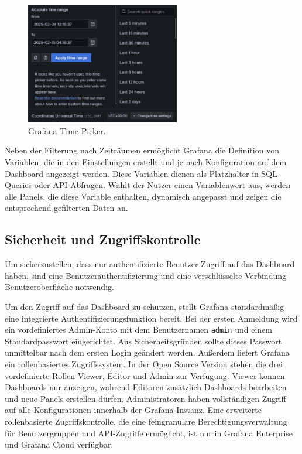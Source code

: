 \begin{figure}[H]
    \centering
    \includegraphics[width=0.6\textwidth, keepaspectratio]{images/timerange.png}
    \caption{Grafana Time Picker.}
    \label{fig:timerange}
\end{figure}

Neben der Filterung nach Zeiträumen ermöglicht Grafana die Definition von Variablen, die in den Einstellungen erstellt und je nach Konfiguration auf dem Dashboard angezeigt werden. Diese Variablen dienen als Platzhalter in SQL-Queries oder API-Abfragen. Wählt der Nutzer einen Variablenwert aus, werden alle Panels, die diese Variable enthalten, dynamisch angepasst und zeigen die entsprechend gefilterten Daten an. \parencite{GrafanaLabsVariables}

\subsection{Sicherheit und Zugriffskontrolle}
Um sicherzustellen, dass nur authentifizierte Benutzer Zugriff auf das Dashboard haben, sind eine Benutzerauthentifizierung und eine verschlüsselte Verbindung Benutzeroberfläche notwendig.

Um den Zugriff auf das Dashboard zu schützen, stellt Grafana standardmäßig eine integrierte Authentifizierungsfunktion bereit. Bei der ersten Anmeldung wird ein vordefiniertes Admin-Konto mit dem Benutzernamen \verb|admin| und einem Standardpasswort eingerichtet. Aus Sicherheitsgründen sollte dieses Passwort unmittelbar nach dem ersten Login geändert werden. Außerdem liefert Grafana ein rollenbasiertes Zugriffssystem. In der Open Source Version stehen die drei vordefinierte Rollen Viewer, Editor und Admin zur Verfügung. Viewer können Dashboards nur anzeigen, während Editoren zusätzlich Dashboards bearbeiten und neue Panels erstellen dürfen. Administratoren haben vollständigen Zugriff auf alle Konfigurationen innerhalb der Grafana-Instanz. Eine erweiterte rollenbasierte Zugriffskontrolle, die eine feingranulare Berechtigungsverwaltung für Benutzergruppen und API-Zugriffe ermöglicht, ist nur in Grafana Enterprise und Grafana Cloud verfügbar. \parencite{GrafanaRBAC}

